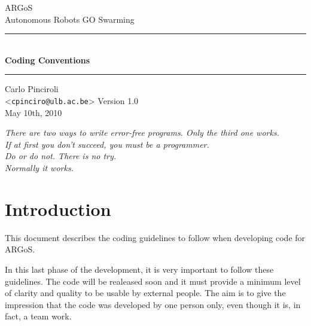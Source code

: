 \documentclass[a4paper]{article}
\newcommand{\argos}{ARGoS\xspace}
\newcommand{\HRule}{\rule{\linewidth}{0.5mm}}
\begin{document}
\begin{titlepage}
  \begin{center}
    {\sc \LARGE \argos}\\[0.5cm]
    {\sc \LARGE Autonomous Robots GO Swarming}
    \vfill
    \HRule\\[0.3cm]
    {\huge \bfseries Coding Conventions}\\[0.3cm]
    \HRule
    \vfill
    {\LARGE Carlo {\sc Pinciroli}}\\[0.5cm]
    <{\tt \LARGE cpinciro@ulb.ac.be}>
    \vfill
    {\LARGE Version 1.0}\\[0.5cm]
    {\LARGE May 10th, 2010}
  \end{center}
\end{titlepage}
\begin{flushright}
  \vspace*{\fill}
  \begin{minipage}{0.5\textwidth}
    \begin{flushright}
      {\it There are two ways to write error-free programs.  Only the
        third one works.}\\[1.5cm]
      {\it If at first you don't succeed, you must be a
        programmer.}\\[1.5cm]
      {\it Do or do not. There is no try.}\\[1.5cm]
      {\it Normally it works.}
    \end{flushright}
  \end{minipage}
  \vspace*{\fill}
\end{flushright}
\newpage
\tableofcontents
\newpage

\lstset{
  language=C++,
  basicstyle=\footnotesize,
  frame=leftline,
  xleftmargin=1em,
  framexleftmargin=0.3em,
  framerule=2pt
}

\section{Introduction}
\label{sec:introduction}
This document describes the coding guidelines to follow when
developing code for \argos.

In this last phase of the development, it is very important to follow these
guidelines. The code will be realeased soon and it must provide a
minimum level of clarity and quality to be usable by external
people. The aim is to give the impression that the code was developed
by one person only, even though it is, in fact, a team work.
\end{document}
